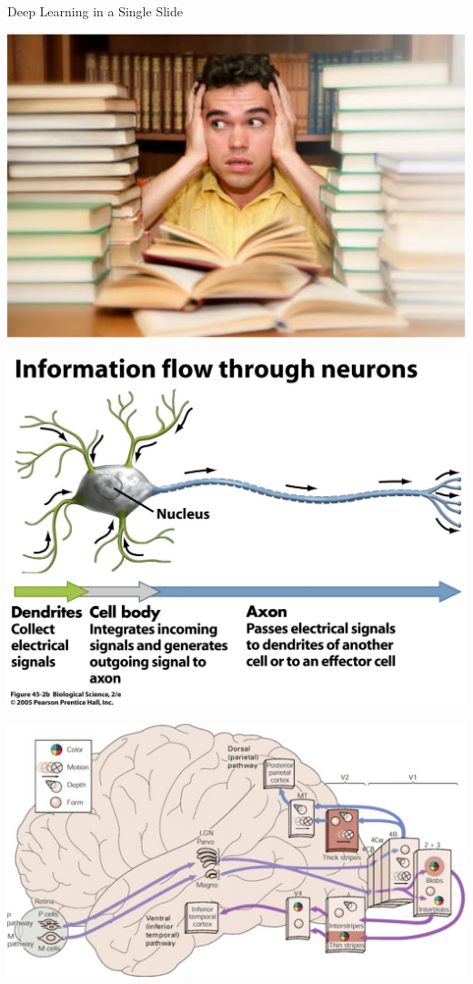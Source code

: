 \documentclass{beamer}
\begin{document}
\begin{frame}{Deep Learning in a Single Slide}

    \vfill

     \centering
     \begin{minipage}{0.32\textwidth}
         \centering
         \includegraphics[width=0.9\columnwidth]{studying.pdf}
     \end{minipage}
     \hfill
     \begin{minipage}{0.32\textwidth}
         \centering
         \includegraphics[width=0.9\columnwidth]{neuron.pdf}
     \end{minipage}
     \hfill
     \begin{minipage}{0.32\textwidth}
         \centering
         \includegraphics[width=0.9\columnwidth]{visual_pathway.pdf}
         \\
     \end{minipage}


\end{frame}
\end{document}
